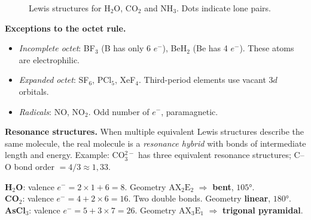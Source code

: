 \documentclass[a4paper,11pt]{article}
\begin{document}
\begin{figure}[H]
\caption{Lewis structures for H$_2$O, CO$_2$ and NH$_3$. Dots indicate lone pairs.}
\end{figure}

\begin{attenzione}
\textbf{Exceptions to the octet rule.}
\begin{itemize}
  \item \textit{Incomplete octet}: BF$_3$ (B has only 6 $e^-$), BeH$_2$ (Be has 4 $e^-$). These atoms are electrophilic.
  \item \textit{Expanded octet}: SF$_6$, PCl$_5$, XeF$_4$. Third-period elements use vacant $3d$ orbitals.
  \item \textit{Radicals}: NO, NO$_2$. Odd number of $e^-$, paramagnetic.
\end{itemize}
\end{attenzione}

\textbf{Resonance structures.} When multiple equivalent Lewis structures describe the same molecule, the real molecule is a \textit{resonance hybrid} with bonds of intermediate length and energy. Example: CO$_3^{2-}$ has three equivalent resonance structures; C--O bond order $= 4/3 \approx 1{,}33$.

\begin{esempio}
\textbf{H$_2$O}: valence $e^- = 2\!\times\!1 + 6 = 8$. Geometry $\mathrm{AX_2E_2}$ $\Rightarrow$ \textbf{bent}, $105°$.\\
\textbf{CO$_2$}: valence $e^- = 4 + 2\!\times\!6 = 16$. Two double bonds. Geometry \textbf{linear}, $180°$.\\
\textbf{AsCl$_3$}: valence $e^- = 5 + 3\!\times\!7 = 26$. Geometry $\mathrm{AX_3E_1}$ $\Rightarrow$ \textbf{trigonal pyramidal}.
\end{esempio}
\end{document}
